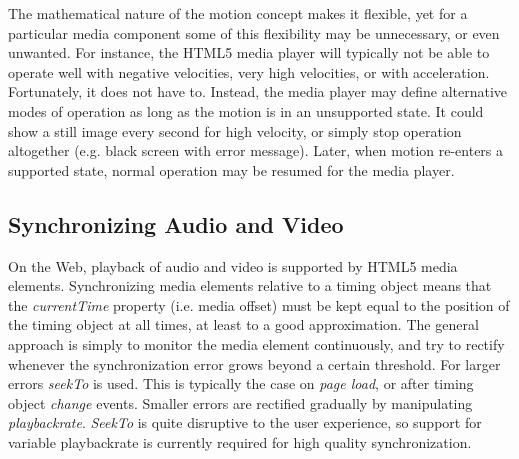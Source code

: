 \label{sec:toomuch}

The mathematical nature of the motion concept makes it flexible, yet for a
particular media component some of this flexibility may be unnecessary, or
even unwanted. For instance, the HTML5 media player will typically not be able
to operate well with negative velocities, very high velocities, or with
acceleration. Fortunately, it does not have to. Instead, the media player may
define alternative modes of operation as long as the motion is in an
unsupported state. It could show a still image every second for high velocity,
or simply stop operation altogether (e.g. black screen with error message).
Later, when motion re-enters a supported state, normal operation may be
resumed for the media player.


\subsection{Synchronizing Audio and Video}
\label{sec:avsync}

On the Web, playback of audio and video is supported by HTML5 media
elements\cite{html5media}. Synchronizing media elements relative to a timing
object means that the \emph{currentTime} property (i.e. media offset) must be
kept equal to the position of the timing object at all times, at least to a
good approximation. The general approach is simply to monitor the media
element continuously, and try to rectify whenever the synchronization error
grows beyond a certain threshold. For larger errors \emph{seekTo} is used. This is
typically the case on \emph{page load}, or after timing object \emph{change} events. Smaller
errors are rectified gradually by manipulating \emph{playbackrate}. \emph{SeekTo} is
quite disruptive to the user experience, so support for variable playbackrate
is currently required for high quality synchronization.

